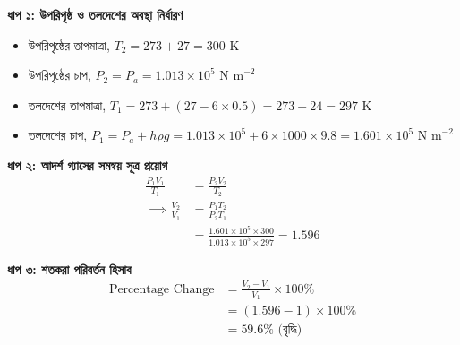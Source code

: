 \documentclass[12pt, a4paper]{article}
\begin{document}
\begin{tcolorbox}[solutionbox={সমাধান (Solution)}]
    \noindent
    \textbf{ধাপ ১: উপরিপৃষ্ঠ ও তলদেশের অবস্থা নির্ধারণ}
    \begin{itemize}[leftmargin=1.5em, itemsep=0.2em]
        \item উপরিপৃষ্ঠের তাপমাত্রা, $T_2 = 273 + 27 = 300\text{ K}$
        \item উপরিপৃষ্ঠের চাপ, $P_2 = P_a = 1.013 \times 10^5\text{ N m}^{-2}$
        \item তলদেশের তাপমাত্রা, $T_1 = 273 + (27 - 6 \times 0.5) = 273 + 24 = 297\text{ K}$
        \item তলদেশের চাপ, $P_1 = P_a + h \rho g = 1.013 \times 10^5 + 6 \times 1000 \times 9.8 = 1.601 \times 10^5\text{ N m}^{-2}$
    \end{itemize}
    
    \vspace{0.4em}
    \noindent\textbf{ধাপ ২: আদর্শ গ্যাসের সমন্বয় সূত্র প্রয়োগ}
    \begin{align*}
        \frac{P_1 V_1}{T_1} &= \frac{P_2 V_2}{T_2} \\
        \implies \frac{V_2}{V_1} &= \frac{P_1 T_2}{P_2 T_1} \\
        &= \frac{1.601 \times 10^5 \times 300}{1.013 \times 10^5 \times 297} = 1.596
    \end{align*}
    
    \vspace{0.4em}
    \noindent\textbf{ধাপ ৩: শতকরা পরিবর্তন হিসাব}
    \begin{align*}
        \text{Percentage Change} &= \frac{V_2 - V_1}{V_1} \times 100\% \\
        &= (1.596 - 1) \times 100\% \\
        &= \mathbf{59.6\% \text{ (বৃদ্ধি)}}
    \end{align*}
\end{tcolorbox}
\end{document}
